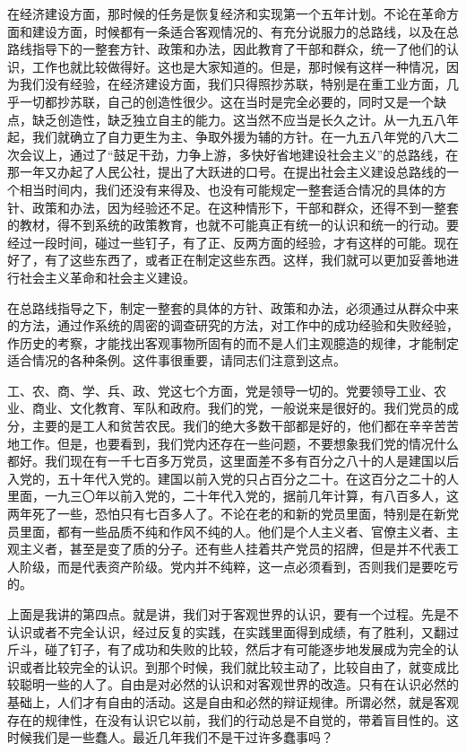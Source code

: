 在经济建设方面，那时候的任务是恢复经济和实现第一个五年计划。不论在革命方面和建设方面，时候都有一条适合客观情况的、有充分说服力的总路线，以及在总路线指导下的一整套方针、政策和办法，因此教育了干部和群众，统一了他们的认识，工作也就比较做得好。这也是大家知道的。但是，那时候有这样一种情况，因为我们没有经验，在经济建设方面，我们只得照抄苏联，特别是在重工业方面，几乎一切都抄苏联，自己的创造性很少。这在当时是完全必要的，同时又是一个缺点，缺乏创造性，缺乏独立自主的能力。这当然不应当是长久之计。从一九五八年起，我们就确立了自力更生为主、争取外援为辅的方针。在一九五八年党的八大二次会议上，通过了“鼓足干劲，力争上游，多快好省地建设社会主义”的总路线，在那一年又办起了人民公社，提出了大跃进的口号。在提出社会主义建设总路线的一个相当时间内，我们还没有来得及、也没有可能规定一整套适合情况的具体的方针、政策和办法，因为经验还不足。在这种情形下，干部和群众，还得不到一整套的教材，得不到系统的政策教育，也就不可能真正有统一的认识和统一的行动。要经过一段时间，碰过一些钉子，有了正、反两方面的经验，才有这样的可能。现在好了，有了这些东西了，或者正在制定这些东西。这样，我们就可以更加妥善地进行社会主义革命和社会主义建设。

在总路线指导之下，制定一整套的具体的方针、政策和办法，必须通过从群众中来的方法，通过作系统的周密的调查研究的方法，对工作中的成功经验和失败经验，作历史的考察，才能找出客观事物所固有的而不是人们主观臆造的规律，才能制定适合情况的各种条例。这件事很重要，请同志们注意到这点。

工、农、商、学、兵、政、党这七个方面，党是领导一切的。党要领导工业、农业、商业、文化教育、军队和政府。我们的党，一般说来是很好的。我们党员的成分，主要的是工人和贫苦农民。我们的绝大多数干部都是好的，他们都在辛辛苦苦地工作。但是，也要看到，我们党内还存在一些问题，不要想象我们党的情况什么都好。我们现在有一千七百多万党员，这里面差不多有百分之八十的人是建国以后入党的，五十年代入党的。建国以前入党的只占百分之二十。在这百分之二十的人里面，一九三〇年以前入党的，二十年代入党的，据前几年计算，有八百多人，这两年死了一些，恐怕只有七百多人了。不论在老的和新的党员里面，特别是在新党员里面，都有一些品质不纯和作风不纯的人。他们是个人主义者、官僚主义者、主观主义者，甚至是变了质的分子。还有些人挂着共产党员的招牌，但是并不代表工人阶级，而是代表资产阶级。党内并不纯粹，这一点必须看到，否则我们是要吃亏的。

上面是我讲的第四点。就是讲，我们对于客观世界的认识，要有一个过程。先是不认识或者不完全认识，经过反复的实践，在实践里面得到成绩，有了胜利，又翻过斤斗，碰了钉子，有了成功和失败的比较，然后才有可能逐步地发展成为完全的认识或者比较完全的认识。到那个时候，我们就比较主动了，比较自由了，就变成比较聪明一些的人了。自由是对必然的认识和对客观世界的改造。只有在认识必然的基础上，人们才有自由的活动。这是自由和必然的辩证规律。所谓必然，就是客观存在的规律性，在没有认识它以前，我们的行动总是不自觉的，带着盲目性的。这时候我们是一些蠢人。最近几年我们不是干过许多蠢事吗？

